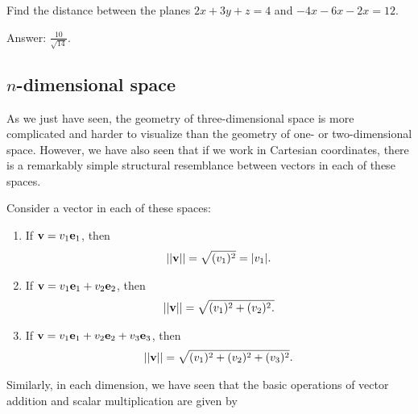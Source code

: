 \documentclass[12pt,letterpaper,reqno]{article}
\numberwithin{equation}{section}
\newcommand{\fixme}[1]{{\color{orange}{[#1]}}}
\begin{document}
\begin{exercise}
Find the distance between the planes $2x+3y+z=4$ and $-4x-6x-2x=12$.	
\end{exercise}

\fixme{Add solution.}

{\color{red} \flushleft Answer: $\frac{10}{\sqrt{14}}$.}



\subsection{$n$-dimensional space}
As we just have seen, the geometry of three-dimensional space is more complicated and harder to visualize than the geometry of one- or two-dimensional space. However, we have also seen that if we work in Cartesian coordinates, there is a remarkably simple structural resemblance between vectors in each of these spaces.

Consider a vector in each of these spaces:
\begin{enumerate}[(1)]
	\item If ${\bf v}=v_1{\bf e}_1$, then
		\begin{align*}
			||{\bf v}||=\sqrt{(v_1)^2}=|v_1|.
		\end{align*}
	\item If ${\bf v}=v_1{\bf e}_1+v_2{\bf e}_2$, then
		\begin{align*}
			||{\bf v}||=\sqrt{(v_1)^2+(v_2)^2.}
		\end{align*}
	\item If ${\bf v}=v_1{\bf e}_1+v_2{\bf e}_2+v_3{\bf e}_3$, then
		\begin{align*}
			||{\bf v}||=\sqrt{(v_1)^2+(v_2)^2+(v_3)^2}.
		\end{align*}
\end{enumerate} 
Similarly, in each dimension, we have seen that the basic operations of vector addition and scalar multiplication are given by
\end{document}
